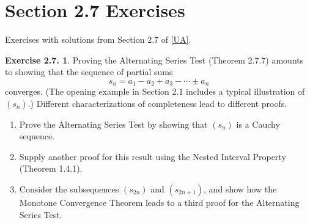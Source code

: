 \documentclass[12pt]{article}
\theoremstyle{definition}
\theoremstyle{exercise}
\newtheorem{exercise}{Exercise 2.7.}
\theoremstyle{solution}
\begin{document}
\section{Section 2.7 Exercises}

Exercises with solutions from Section 2.7 of \hyperlink{ua}{[UA]}.

\begin{exercise}
\label{ex:1}
    Proving the Alternating Series Test (Theorem 2.7.7) amounts to showing that the sequence of partial sums
    \[
        s_n = a_1 - a_2 + a_3 - \cdots \pm a_n
    \]
    converges. (The opening example in Section 2.1 includes a typical illustration of \( (s_n) \).) Different characterizations of completeness lead to different proofs.
    \begin{enumerate}
        \item Prove the Alternating Series Test by showing that \( (s_n) \) is a Cauchy sequence.

        \item Supply another proof for this result using the Nested Interval Property (Theorem 1.4.1).

        \item Consider the subsequences \( (s_{2n}) \) and \( (s_{2n+1}) \), and show how the Monotone Convergence Theorem leads to a third proof for the Alternating Series Test.
    \end{enumerate}
\end{exercise}
\end{document}

